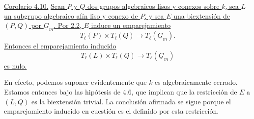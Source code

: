 \medskip
\noindent\underline{Corolario 4.10.} \underline{Sean $P$ y $Q$ dos
grupos algebraicos lisos y conexos sobre $k$, sea $L$ un subgrupo
algebraico afín liso y conexo de $P$, y sea $E$ una biextensión de
$(P,Q)$ por $\underline G_m$. Por 2.2, $E$ induce un emparejamiento}
\[
 T_\ell(P)\times T_\ell(Q)\longrightarrow T_\ell(\underline G_m).
\]
\underline{Entonces el emparejamiento inducido}
\[
 T_\ell(L)\times T_\ell(Q)\longrightarrow T_\ell(\underline G_m)
\]
\underline{es nulo.}

En efecto, podemos suponer evidentemente que $k$ es algebraicamente
cerrado. Estamos entonces bajo las hipótesis de 4.6, que implican que
la restricción de $E$ a $(L,Q)$ es la biextensión trivial. La conclusión
afirmada se sigue porque el emparejamiento inducido en cuestión es el
definido por esta restricción.
